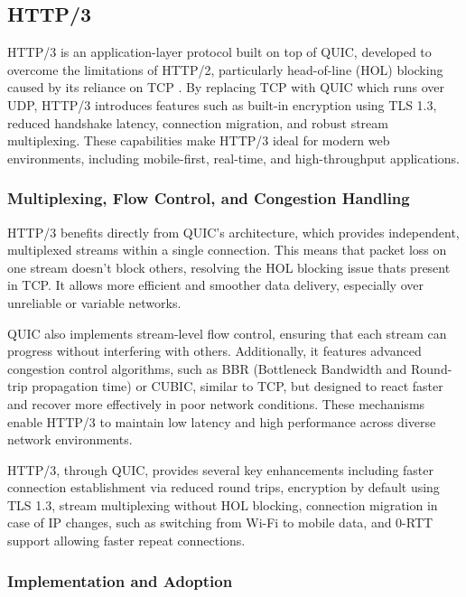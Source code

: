 \subsection{HTTP/3}

HTTP/3 is an application-layer protocol built on top of QUIC, developed to overcome the limitations of HTTP/2, particularly head-of-line (HOL) blocking caused by its reliance on TCP \cite{rfc9114} \cite{marx2021-http3}. By replacing TCP with QUIC which runs over UDP, HTTP/3 introduces features such as built-in encryption using TLS 1.3, reduced handshake latency, connection migration, and robust stream multiplexing. These capabilities make HTTP/3 ideal for modern web environments, including mobile-first, real-time, and high-throughput applications.

\subsubsection{Multiplexing, Flow Control, and Congestion Handling}

HTTP/3 benefits directly from QUIC’s architecture, which provides independent, multiplexed streams within a single connection. This means that packet loss on one stream doesn’t block others, resolving the HOL blocking issue thats present in TCP. It allows more efficient and smoother data delivery, especially over unreliable or variable networks.

QUIC also implements stream-level flow control, ensuring that each stream can progress without interfering with others. Additionally, it features advanced congestion control algorithms, such as BBR (Bottleneck Bandwidth and Round-trip propagation time) or CUBIC, similar to TCP, but designed to react faster and recover more effectively in poor network conditions. These mechanisms enable HTTP/3 to maintain low latency and high performance across diverse network environments.

HTTP/3, through QUIC, provides several key enhancements including faster connection establishment via reduced round trips, encryption by default using TLS 1.3, stream multiplexing without HOL blocking, connection migration in case of IP changes, such as switching from Wi-Fi to mobile data, and 0-RTT support allowing faster repeat connections.


\subsubsection{Implementation and Adoption}

